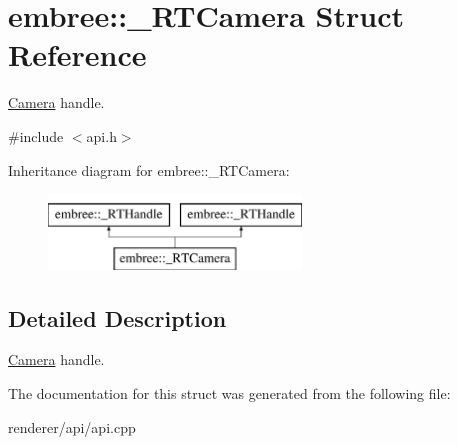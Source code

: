 \hypertarget{structembree_1_1___r_t_camera}{
\section{embree::\_\-RTCamera Struct Reference}
\label{structembree_1_1___r_t_camera}
}


\hyperlink{classembree_1_1_camera}{Camera} handle.  




{\ttfamily \#include $<$api.h$>$}

Inheritance diagram for embree::\_\-RTCamera:\begin{figure}[H]
\begin{center}
\leavevmode
\includegraphics[height=2.000000cm]{structembree_1_1___r_t_camera}
\end{center}
\end{figure}


\subsection{Detailed Description}
\hyperlink{classembree_1_1_camera}{Camera} handle. 

The documentation for this struct was generated from the following file:\begin{DoxyCompactItemize}
\item 
renderer/api/api.cpp\end{DoxyCompactItemize}
